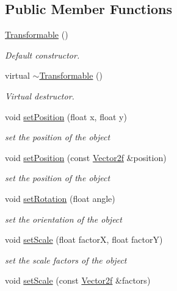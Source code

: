 \subsection*{Public Member Functions}
\begin{DoxyCompactItemize}
\item 
\mbox{\hyperlink{classsf_1_1_transformable_ae71710de0fef423121bab1c684954a2e}{Transformable}} ()
\begin{DoxyCompactList}\small\item\em Default constructor. \end{DoxyCompactList}\item 
virtual \mbox{\hyperlink{classsf_1_1_transformable_a43253abcb863195a673c2a347a7425cc}{$\sim$\+Transformable}} ()
\begin{DoxyCompactList}\small\item\em Virtual destructor. \end{DoxyCompactList}\item 
void \mbox{\hyperlink{classsf_1_1_transformable_a4dbfb1a7c80688b0b4c477d706550208}{set\+Position}} (float x, float y)
\begin{DoxyCompactList}\small\item\em set the position of the object \end{DoxyCompactList}\item 
void \mbox{\hyperlink{classsf_1_1_transformable_af1a42209ce2b5d3f07b00f917bcd8015}{set\+Position}} (const \mbox{\hyperlink{classsf_1_1_vector2}{Vector2f}} \&position)
\begin{DoxyCompactList}\small\item\em set the position of the object \end{DoxyCompactList}\item 
void \mbox{\hyperlink{classsf_1_1_transformable_a32baf2bf1a74699b03bf8c95030a38ed}{set\+Rotation}} (float angle)
\begin{DoxyCompactList}\small\item\em set the orientation of the object \end{DoxyCompactList}\item 
void \mbox{\hyperlink{classsf_1_1_transformable_aaec50b46b3f41b054763304d1e727471}{set\+Scale}} (float factorX, float factorY)
\begin{DoxyCompactList}\small\item\em set the scale factors of the object \end{DoxyCompactList}\item 
void \mbox{\hyperlink{classsf_1_1_transformable_a4c48a87f1626047e448f9c1a68ff167e}{set\+Scale}} (const \mbox{\hyperlink{classsf_1_1_vector2}{Vector2f}} \&factors)

\end{DoxyCompactItemize}
